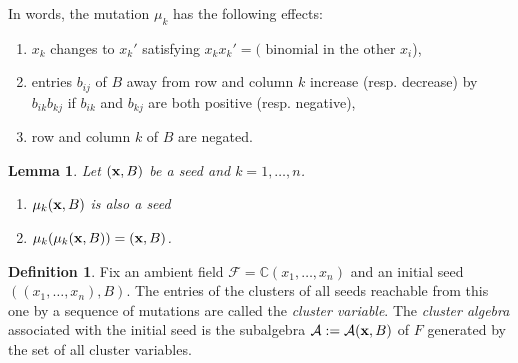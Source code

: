 \documentclass{amsart}
\newtheorem{lemma}[theorem]{Lemma}
\theoremstyle{definition}
\newtheorem{definition}[theorem]{Definition}
\theoremstyle{remark}
\numberwithin{equation}{section}
\newcommand{\cA}{{\mathcal{A}}}
\newcommand{\cF}{{\mathcal{F}}}
\newcommand{\x}{{\bf x}}
\newcommand{\bx}{{\bf x}}
\newcommand{\CC}{{\mathbb{C}}}
\begin{document}
	In words, the mutation $\mu_k$ has the following effects:
	\begin{enumerate}
	\item $x_k$ changes to $x_k'$ satisfying $x_kx_k' = (\textrm{ binomial in the other } x_i$),
	\item entries $b_{ij}$ of $B$ away from row and column $k$ increase (resp. decrease) by $b_{ik}b_{kj}$ if $b_{ik}$ and $b_{kj}$ are both positive (resp. negative),
	\item row and column $k$ of $B$ are negated.
	\end{enumerate}
	
	\begin{lemma} \label{lem:mutate}
	Let $(\x,B)$ be a seed and $k=1,\ldots, n$.
	\begin{enumerate}
		\item $\mu_k(\x,B)$ is also a seed
		\item $\mu_k(\mu_k(\x,B)) = (\x,B)$.
	\end{enumerate}
	\end{lemma}
	
	\begin{definition}
		Fix an ambient field $\cF = \CC(x_1,\ldots, x_n)$ and an initial seed $((x_1,\ldots, x_n), B)$.  The entries of the clusters of all seeds reachable from this one by a sequence of mutations are called the \emph{cluster variable}.  The \emph{cluster algebra} associated with the initial seed is the subalgebra $\cA:=\cA(\bx,B)$ of $F$ generated by the set of all cluster variables.
	\end{definition}
	
\end{document}
